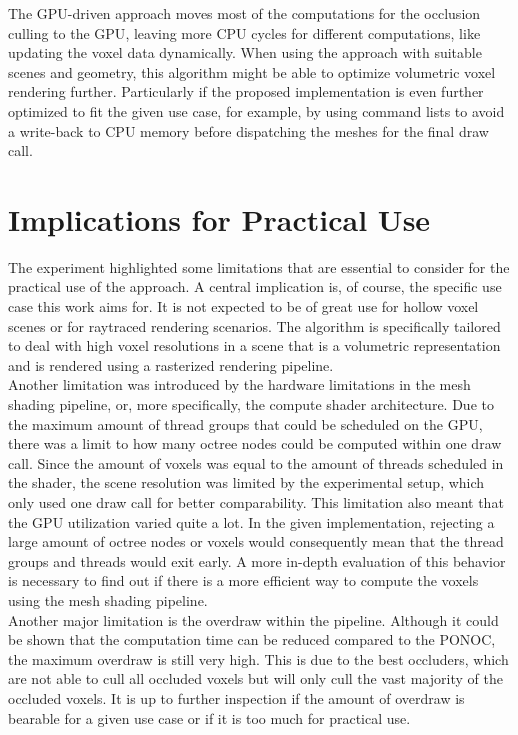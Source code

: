 \noindent
The \ac{GPU}-driven approach moves most of the computations for the occlusion culling to the \ac{GPU}, leaving more 
\ac{CPU} cycles for different computations, like updating the voxel data dynamically. When using the approach with 
suitable scenes and geometry, this algorithm might be able to optimize volumetric voxel rendering further. Particularly 
if the proposed implementation is even further optimized to fit the given use case, for example, by using command lists 
to avoid a write-back to \ac{CPU} memory before dispatching the meshes for the final draw call. \\

\section{Implications for Practical Use}

The experiment highlighted some limitations that are essential to consider for the practical use of the approach. 
A central implication is, of course, the specific use case this work aims for. It is not expected to be of great use 
for hollow voxel scenes or for raytraced rendering scenarios. The algorithm is specifically tailored to deal with 
high voxel resolutions in a scene that is a volumetric representation and is rendered using a rasterized rendering 
pipeline. \\

\noindent
Another limitation was introduced by the hardware limitations in the mesh shading pipeline, or, more specifically, the 
compute shader architecture. Due to the maximum amount of thread groups that could be scheduled on the \ac{GPU}, there 
was a limit to how many octree nodes could be computed within one draw call. Since the amount of voxels was equal to the 
amount of threads scheduled in the shader, the scene resolution was limited by the experimental setup, which only used 
one draw call for better comparability. This limitation also meant that the \ac{GPU} utilization varied quite a lot. 
In the given implementation, rejecting a large amount of octree nodes or voxels would consequently mean that the thread 
groups and threads would exit early. A more in-depth evaluation of this behavior is necessary to find out if there is a 
more efficient way to compute the voxels using the mesh shading pipeline. \\

\noindent
Another major limitation is the overdraw within the pipeline. Although it could be shown that the computation time 
can be reduced compared to the \ac{PONOC}, the maximum overdraw is still very high. This is due to the best occluders, 
which are not able to cull all occluded voxels but will only cull the vast majority of the occluded voxels. It is up 
to further inspection if the amount of overdraw is bearable for a given use case or if it is too much for practical 
use. \\
\enlargethispage{\baselineskip}

